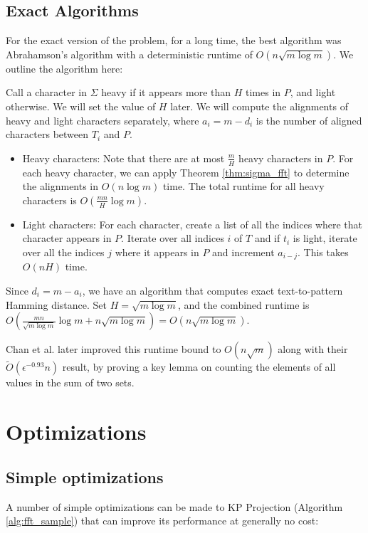 \documentclass{article}
\theoremstyle{definition}
\newcommand{\eps}{\epsilon}
\begin{document}
\subsection{Exact Algorithms}

For the exact version of the problem, for a long time, the best algorithm was Abrahamson's algorithm \cite{abrahamson87} with a deterministic runtime of $O(n \sqrt{m \log m})$.
We outline the algorithm here: 

Call a character in $\Sigma$ heavy if it appears more than $H$ times in $P$, and light otherwise.
We will set the value of $H$ later.
We will compute the alignments of heavy and light characters separately, where $a_i = m - d_i$ is the number of aligned characters between $T_i$ and $P$.

\begin{itemize}
    \item Heavy characters:
    Note that there are at most $\frac{m}{H}$ heavy characters in $P$.
    For each heavy character, we can apply Theorem \ref{thm:sigma_fft} to determine the alignments in $O(n \log m)$ time.
    The total runtime for all heavy characters is $O(\frac{mn}{H} \log m)$.
    \item Light characters:
    For each character, create a list of all the indices where that character appears in $P$.
    Iterate over all indices $i$ of $T$ and if $t_i$ is light, iterate over all the indices $j$ where it appears in $P$ and increment $a_{i-j}$.
    This takes $O(n H)$ time.
\end{itemize}
Since $d_i = m - a_i$, we have an algorithm that computes exact text-to-pattern Hamming distance.
Set $H = \sqrt{m \log m}$, and the combined runtime is $O(\frac{mn}{\sqrt{m \log m}} \log m + n \sqrt{m \log m}) = O(n \sqrt{m \log m})$.

Chan et al. later improved this runtime bound to $O(n \sqrt{m})$ \cite{chan2024} along with their $\tilde{O}(\eps^{-0.93} n)$ result, by proving a key lemma on counting the elements of all values in the sum of two sets.

\section{Optimizations}

\subsection{Simple optimizations}

A number of simple optimizations can be made to KP Projection (Algorithm \ref{alg:fft_sample}) that can improve its performance at generally no cost:
\end{document}
